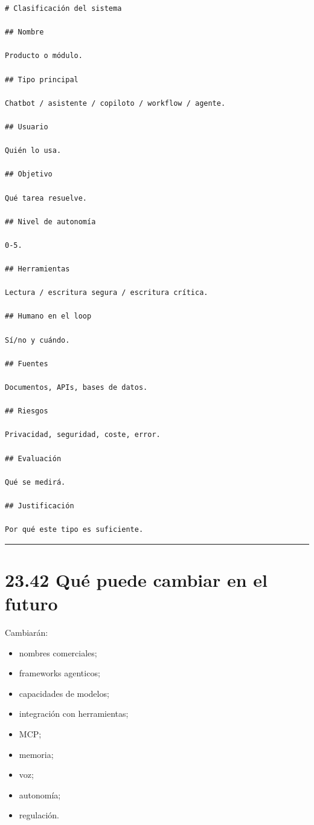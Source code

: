 \begin{lstlisting}
# Clasificación del sistema

## Nombre

Producto o módulo.

## Tipo principal

Chatbot / asistente / copiloto / workflow / agente.

## Usuario

Quién lo usa.

## Objetivo

Qué tarea resuelve.

## Nivel de autonomía

0-5.

## Herramientas

Lectura / escritura segura / escritura crítica.

## Humano en el loop

Sí/no y cuándo.

## Fuentes

Documentos, APIs, bases de datos.

## Riesgos

Privacidad, seguridad, coste, error.

## Evaluación

Qué se medirá.

## Justificación

Por qué este tipo es suficiente.
\end{lstlisting}

\begin{center}\rule{0.5\linewidth}{0.5pt}\end{center}

\section{23.42 Qué puede cambiar en el
futuro}\label{quuxe9-puede-cambiar-en-el-futuro-22}

Cambiarán:

\begin{itemize}
\tightlist
\item
  nombres comerciales;
\item
  frameworks agenticos;
\item
  capacidades de modelos;
\item
  integración con herramientas;
\item
  MCP;
\item
  memoria;
\item
  voz;
\item
  autonomía;
\item
  regulación.
\end{itemize}

